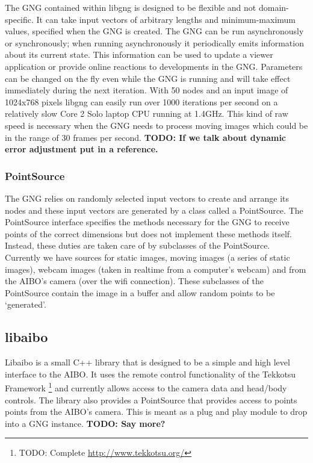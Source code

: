 \documentclass{article}
\renewcommand{\|}{\origbar} %
\begin{document}
The GNG contained within libgng is designed to be flexible and not domain-specific. It can take input vectors of arbitrary lengths and minimum-maximum values, specified when the GNG is created. The GNG can be run asynchronously or synchronously; when running asynchronously it periodically emits information about its current state. This information can be used to update a viewer application or provide online reactions to developments in the GNG. Parameters can be changed on the fly even while the GNG is running and will take effect immediately during the next iteration. With 50 nodes and an input image of 1024x768 pixels libgng can easily run over 1000 iterations per second on a relatively slow Core 2 Solo laptop CPU running at 1.4GHz. This kind of raw speed is necessary when the GNG needs to process moving images which could be in the range of 30 frames per second. {\bf TODO: If we talk about dynamic error adjustment put in a reference.}

\subsubsection{PointSource}

The GNG relies on randomly selected input vectors to create and arrange its nodes and these input vectors are generated by a class called a PointSource. The PointSource interface specifies the methods necessary for the GNG to receive points of the correct dimensions but does not implement these methods itself. Instead, these duties are taken care of by subclasses of the PointSource. Currently we have sources for static images, moving images (a series of static images), webcam images (taken in realtime from a computer's webcam) and from the AIBO's camera (over the wifi connection). These subclasses of the PointSource contain the image in a buffer and allow random points to be `generated'.

\subsection{libaibo}

Libaibo is a small C++ library that is designed to be a simple and high level interface to the AIBO. It uses the remote control functionality of the Tekkotsu Framework \footnote{TODO: Complete \url{http://www.tekkotsu.org/}} and currently allows access to the camera data and head/body controls. The library also provides a PointSource that provides access to points points from the AIBO's camera. This is meant as a plug and play module to drop into a GNG instance. {\bf TODO: Say more?}
\end{document}
